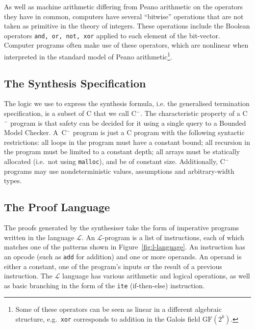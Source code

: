\documentclass[preprint]{sigplanconf}
\theoremstyle{definition}
\newcommand{\newC}{C$^-$\xspace}
\begin{document}

As well as machine arithmetic differing from Peano arithmetic on the
operators they have in common, computers have several ``bitwise'' operations
that are not taken as primitive in the theory of integers.  These operations
include the Boolean operators \texttt{and, or, not, xor} applied to each
element of the bit-vector.  Computer programs often make use of these
operators, which are nonlinear when interpreted in the standard model of
Peano arithmetic\footnote{Some of these operators can be seen as
linear in a different algebraic structure, e.g.~\texttt{xor} corresponds to
addition in the Galois field $\mathrm{GF}(2^k)$.}.

\subsection{The Synthesis Specification}

The logic we use to express the synthesis formula, i.e.
the generalised termination specification, is a subset of C that we call
\newC.  The characteristic property of a \newC program is that safety can be
decided for it using a single query to a Bounded Model Checker.  A~\newC
program is just a C program with the following syntactic restrictions:
 all loops in the program must have a constant bound;
 all recursion in the program must be limited to a constant depth;
 all arrays must be statically allocated (i.e.~not using \texttt{malloc}),
 and be of constant size.
Additionally, \newC programs may use nondeterministic values, assumptions
and arbitrary-width types.

\subsection{The Proof Language}

The proofs generated by the synthesiser take the form of imperative programs
written in the language $\mathcal{L}$.  An $\mathcal{L}$-program is a list
of instructions, each of which matches one of the patterns shown in
Figure~\ref{fig:l-language}.  An instruction has an opcode (such as
\verb|add| for addition) and one or more operands.  An operand is either a
constant, one of the program's inputs or the result of a previous
instruction.  The $\mathcal{L}$ language has various arithmetic and logical
operations, as well as basic branching in the form of the \verb|ite|
(if-then-else) instruction.
\end{document}
